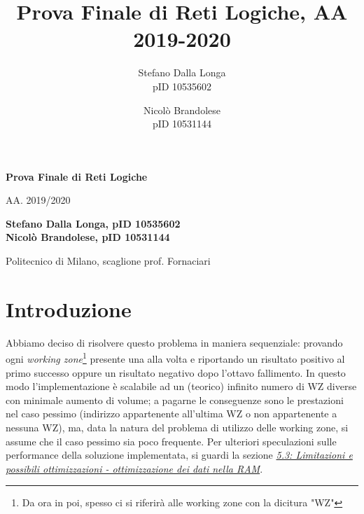 \documentclass[12pt,a4paper,titlepage]{article}
\author{Stefano Dalla Longa\\pID 10535602 \and Nicolò Brandolese\\pID 10531144}
\date{}
\title{Prova Finale di Reti Logiche, AA 2019-2020}
\begin{document}
	\begin{titlepage}
    \begin{center}
        \vspace*{3cm}
            
        \Huge
        \textbf{Prova Finale di Reti Logiche}
            
        \vspace{0.5cm}
        \LARGE
        AA. 2019/2020
            
        \vspace{1.5cm}
            
        \textbf{Stefano Dalla Longa, pID 10535602 \\ Nicolò Brandolese, pID 10531144}
        
        \vspace{1.2 cm}
        \Large
		Politecnico di Milano, scaglione prof. Fornaciari
            
        \vspace{0.8cm}
            
    \end{center}
\end{titlepage}

	\renewcommand{\contentsname}{Indice}	%

	\tableofcontents
	\clearpage	%
	\section{Introduzione}
   
		Abbiamo deciso di risolvere questo problema in maniera sequenziale: provando ogni \textit{working zone}\footnote{Da ora in poi, spesso ci si riferirà alle working zone con la dicitura "WZ"} presente una alla volta e riportando un risultato positivo al primo successo oppure un risultato negativo dopo l'ottavo fallimento.
In questo modo l'implementazione è scalabile ad un (teorico) infinito numero di WZ diverse con minimale aumento di volume; a pagarne le conseguenze sono le prestazioni nel caso pessimo (indirizzo appartenente all'ultima WZ o non appartenente a nessuna WZ), ma, data la natura del problema di utilizzo delle working zone, si assume che il caso pessimo sia poco frequente.
Per ulteriori speculazioni sulle performance della soluzione implementata, si guardi la sezione \hyperref[sec:ottimizzazione]{\textit{5.3: Limitazioni e possibili ottimizzazioni - ottimizzazione dei dati nella RAM}}.
       
\end{document}
